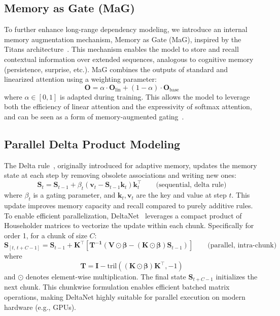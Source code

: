 \documentclass[10pt,a4paper]{article}
\begin{document}
\subsection{Memory as Gate (MaG)}

To further enhance long-range dependency modeling, we introduce an internal memory augmentation mechanism, Memory as Gate (MaG), inspired by the Titans architecture~\cite{behrouz2024titans}. This mechanism enables the model to store and recall contextual information over extended sequences, analogous to cognitive memory (persistence, surprise, etc.). MaG combines the outputs of standard and linearized attention using a weighting parameter:
\begin{equation}
\mathbf{O} = \alpha \cdot \mathbf{O}_{\text{lin}} + (1-\alpha) \cdot \mathbf{O}_{\text{base}}
\end{equation}
where $\alpha \in [0,1]$ is adapted during training. This allows the model to leverage both the efficiency of linear attention and the expressivity of softmax attention, and can be seen as a form of memory-augmented gating~\cite{behrouz2024titans, mercat2024linearizing, munkhdalai2024leave}.

\subsection{Parallel Delta Product Modeling}

The Delta rule~\cite{rumelhart1986learning}, originally introduced for adaptive memory, updates the memory state at each step by removing obsolete associations and writing new ones:
\begin{equation}
    \mathbf{S}_t = \mathbf{S}_{t-1} + \beta_t \left( \mathbf{v}_t - \mathbf{S}_{t-1} \mathbf{k}_t \right) \mathbf{k}_t^\top
    \qquad \text{(sequential, delta rule)}
\end{equation}
where $\beta_t$ is a gating parameter, and $\mathbf{k}_t, \mathbf{v}_t$ are the key and value at step $t$. This update improves memory capacity and recall compared to purely additive rules. To enable efficient parallelization, DeltaNet~\cite{yang2024parallelizing} leverages a compact product of Householder matrices to vectorize the update within each chunk. Specifically for order 1, for a chunk of size $C$:
\begin{equation}
    \mathbf{S}_{[t,\,t+C-1]} = \mathbf{S}_{t-1} + \mathbf{K}^\top
    \left[ \mathbf{T^{-1}}
    \left( \mathbf{V} \odot \boldsymbol{\beta} - (\mathbf{K} \odot \boldsymbol{\beta}) \mathbf{S}_{t-1} \right) \right]
    \qquad \text{(parallel, intra-chunk)}
\end{equation}
where
\[
\mathbf{T} = \mathbf{I} - \mathrm{tril}\left((\mathbf{K} \odot \boldsymbol{\beta}) \mathbf{K}^\top, -1\right)
\]
and $\odot$ denotes element-wise multiplication. The final state $\mathbf{S}_{t+C-1}$ initializes the next chunk. This chunkwise formulation enables efficient batched matrix operations, making DeltaNet highly suitable for parallel execution on modern hardware (e.g., GPUs).
\end{document}
